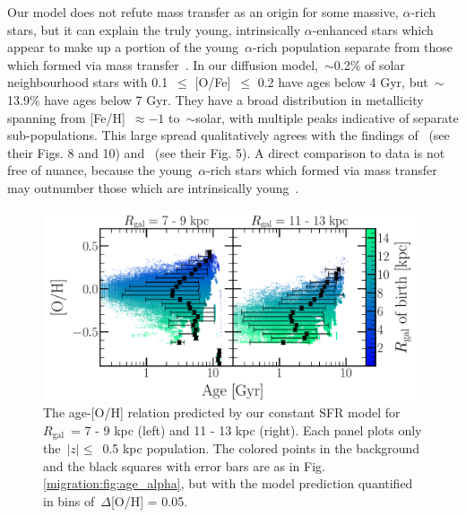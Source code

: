 Our model does not refute mass transfer as an origin for some massive, 
$\alpha$-rich stars, but it can explain the truly young, intrinsically 
$\alpha$-enhanced stars which appear to make up a portion of the 
young~$\alpha$-rich population separate from those which formed via mass 
transfer~\citep{Yong2016, Hekker2019}. 
In our diffusion model,~$\sim$0.2\% of solar neighbourhood stars with 0.1~$\leq$ 
[O/Fe]~$\leq$ 0.2 have ages below 4 Gyr, but~$\sim$13.9\% have ages below 7 Gyr. 
They have a broad distribution in metallicity spanning from [Fe/H]~$\approx-1$ 
to~$\sim$solar, with multiple peaks indicative of separate sub-populations. 
This large spread qualitatively agrees with the findings 
of~\citet{SilvaAguirre2018} (see their Figs. 8 and 10) and~\citet{Miglio2021} 
(see their Fig. 5). 
A direct comparison to data is not free of nuance, because the 
young~$\alpha$-rich stars which formed via mass transfer may outnumber 
those which are intrinsically young~\citep{Miglio2021}. 

\begin{figure} 
\centering 
\includegraphics[scale = 0.45]{amr_static_o.pdf} 
\caption{The age-[O/H] relation predicted by our constant SFR model for 
$R_\text{gal}$~= 7 - 9 kpc (left) and 11 - 13 kpc (right). Each panel plots 
only the~$\left|z\right|\leq$~0.5 kpc population. The colored points in the 
background and the black squares with error bars are as in Fig. 
\ref{migration:fig:age_alpha}, but with the model prediction quantified in bins 
of~$\Delta$[O/H] = 0.05. } 
\label{migration:fig:age_oh_static} 
\end{figure} 

